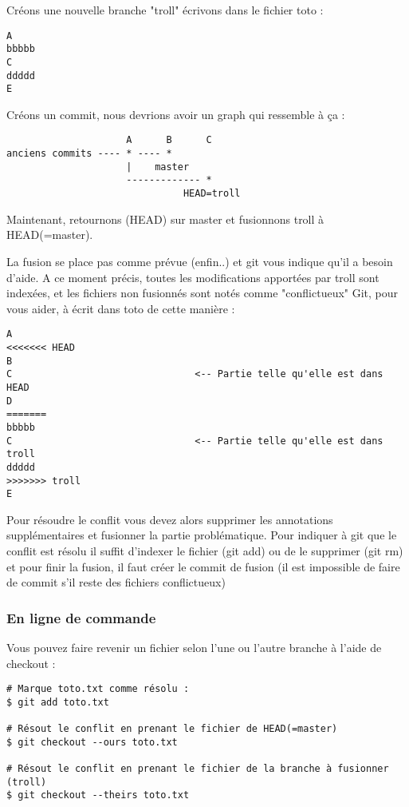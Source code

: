 Créons une nouvelle branche "troll" écrivons dans le fichier toto :
\begin{verbatim}
A
bbbbb
C
ddddd
E
\end{verbatim}

Créons un commit, nous devrions avoir un graph qui ressemble à ça :

\begin{verbatim}
                     A      B      C
anciens commits ---- * ---- *
                     |    master
                     ------------- *
                               HEAD=troll
\end{verbatim}

Maintenant, retournons (HEAD) sur master et fusionnons troll à HEAD(=master).

La fusion se place pas comme prévue (enfin..) et git vous indique qu'il a besoin d'aide.
A ce moment précis, toutes les modifications apportées par troll sont indexées, et les fichiers non fusionnés sont notés comme "conflictueux"
\newpage
Git, pour vous aider, à écrit dans toto de cette manière :
\begin{verbatim}
A
<<<<<<< HEAD
B
C                                <-- Partie telle qu'elle est dans HEAD
D
=======
bbbbb
C                                <-- Partie telle qu'elle est dans troll
ddddd
>>>>>>> troll
E
\end{verbatim}

Pour résoudre le conflit vous devez alors supprimer les annotations supplémentaires et fusionner la partie problématique.
Pour indiquer à git que le conflit est résolu il suffit d'indexer le fichier (git add) ou de le supprimer (git rm) et pour finir la fusion, il faut créer le commit de fusion (il est impossible de faire de commit s'il reste des fichiers conflictueux)

\subsubsection{En ligne de commande}

Vous pouvez faire revenir un fichier selon l'une ou l'autre branche à l'aide de checkout :
\begin{verbatim}
# Marque toto.txt comme résolu :
$ git add toto.txt

# Résout le conflit en prenant le fichier de HEAD(=master)
$ git checkout --ours toto.txt

# Résout le conflit en prenant le fichier de la branche à fusionner (troll)
$ git checkout --theirs toto.txt
\end{verbatim}


